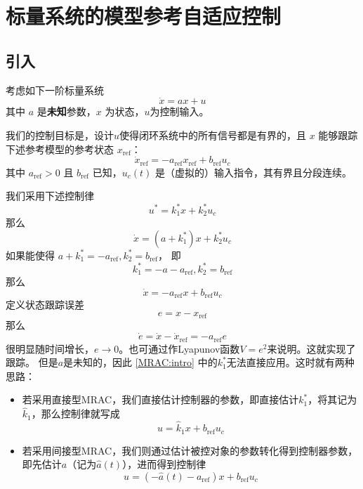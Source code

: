 \newpage
\section{标量系统的模型参考自适应控制}\label{4Bref}
\subsection{引入}
考虑如下一阶标量系统
  \[ \dot{x} = a  x + u \]
  其中 $a$ 是{\bf 未知}参数，$x$ 为状态，$u$为控制输入。
  
  我们的控制目标是，设计$u$使得闭环系统中的所有信号都是有界的，且 $x$ 能够跟踪下述参考模型的参考状态  $x_{\ensuremath{\operatorname{ref}}}$：
  \[ \dot{x}_{\ensuremath{\operatorname{ref}}} = -
     a_{\ensuremath{\operatorname{ref}}} x_{\ensuremath{\operatorname{ref}}} +
     b_{\ensuremath{\operatorname{ref}}} u_c \]
  其中 $a_{\ensuremath{\operatorname{ref}}} > 0$ 且
  $b_{\ensuremath{\operatorname{ref}}}$ 已知，$u_c (t)$ 是（虚拟的）输入指令，其有界且分段连续。
  
  我们采用下述控制律
  \[ u^{\ast} = k^{\ast}_1 x + k^{\ast}_2 u_c \]
  那么
  \[\dot{x} = (a +  k^{\ast}_1) x + k^{\ast}_2 {u_c} \]
  如果能使得
  $a+  k^{\ast}_1=-a_{\ensuremath{\operatorname{ref}}},k^{\ast}_2=b_{\ensuremath{\operatorname{ref}}}$，
  即
  \begin{equation}\label{MRAC:intro}
      k^{\ast}_1 = - a - a_{\ensuremath{\operatorname{ref}}}, k^{\ast}_2 =  b_{\ensuremath{\operatorname{ref}}}
  \end{equation}
  那么\[\dot{x} = -a_{\ensuremath{\operatorname{ref}}} x + b_{\ensuremath{\operatorname{ref}}} {u_c} \]
  定义状态跟踪误差
  \[ e = x - x_{\ensuremath{\operatorname{ref}}} \]
  那么  
  \[ \dot{e} = \dot{x} - \dot{x}_{\ensuremath{\operatorname{ref}}} = -
  a_{\ensuremath{\operatorname{ref}}} e \]
  很明显随时间增长，$e\to 0$。也可通过作Lyapunov函数$V=e^2$来说明。这就实现了跟踪。
  但是$a$是未知的，因此 \eqref{MRAC:intro} 中的$k_1^\ast$无法直接应用。这时就有两种思路：
  \begin{itemize}
      \item 若采用直接型MRAC，我们直接估计控制器的参数，即直接估计$k_1^\ast$，将其记为$\hat{k}_1$，那么控制律就写成
      \[u=\hat{k}_1 x + b_{\ensuremath{\operatorname{ref}}} u_c\]
      \item 若采用间接型MRAC，我们则通过估计被控对象的参数转化得到控制器参数，即先估计$a$（记为$ \hat{a} (t)$），进而得到控制律
      \[u=(- \hat{a} (t) - a_{\ensuremath{\operatorname{ref}}}) x +
       b_{\ensuremath{\operatorname{ref}}} u_c\]
  \end{itemize}
\newpage
